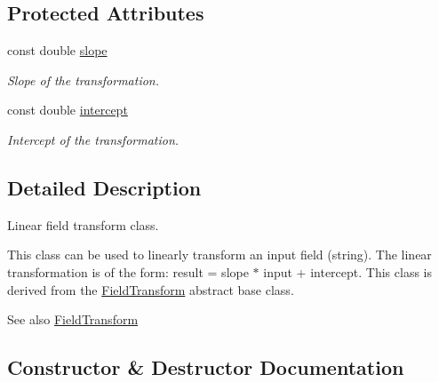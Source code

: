 \subsection*{Protected Attributes}
\begin{DoxyCompactItemize}
\item 
const double \hyperlink{classtudat_1_1input__output_1_1LinearFieldTransform_a9afdff8005651fcdb2e8b2c9db21df91}{slope}\hypertarget{classtudat_1_1input__output_1_1LinearFieldTransform_a9afdff8005651fcdb2e8b2c9db21df91}{}\label{classtudat_1_1input__output_1_1LinearFieldTransform_a9afdff8005651fcdb2e8b2c9db21df91}

\begin{DoxyCompactList}\small\item\em Slope of the transformation. \end{DoxyCompactList}\item 
const double \hyperlink{classtudat_1_1input__output_1_1LinearFieldTransform_a00fb52aeff04f40dd6da39ed0bee8529}{intercept}\hypertarget{classtudat_1_1input__output_1_1LinearFieldTransform_a00fb52aeff04f40dd6da39ed0bee8529}{}\label{classtudat_1_1input__output_1_1LinearFieldTransform_a00fb52aeff04f40dd6da39ed0bee8529}

\begin{DoxyCompactList}\small\item\em Intercept of the transformation. \end{DoxyCompactList}\end{DoxyCompactItemize}


\subsection{Detailed Description}
Linear field transform class. 

This class can be used to linearly transform an input field (string). The linear transformation is of the form\+: result = slope $\ast$ input + intercept. This class is derived from the \hyperlink{classtudat_1_1input__output_1_1FieldTransform}{Field\+Transform} abstract base class. \begin{DoxySeeAlso}{See also}
\hyperlink{classtudat_1_1input__output_1_1FieldTransform}{Field\+Transform} 
\end{DoxySeeAlso}


\subsection{Constructor \& Destructor Documentation}
